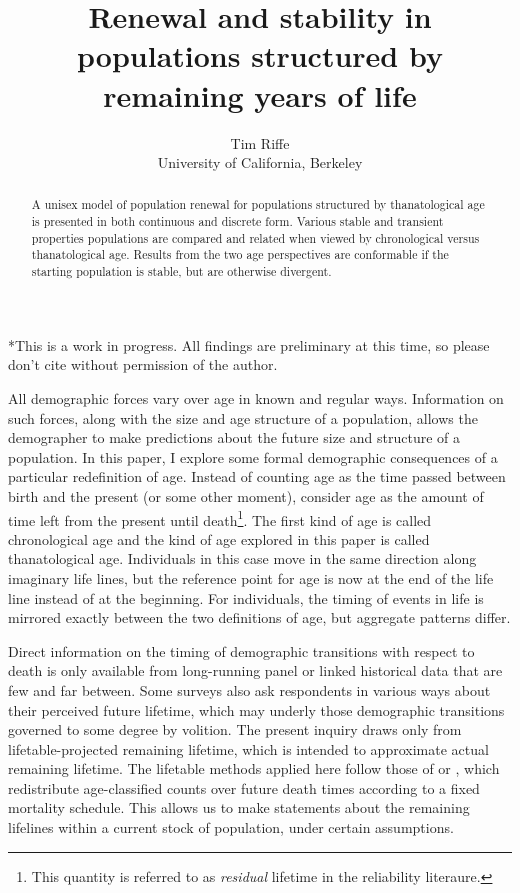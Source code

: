\documentclass{article}
\begin{document}
\title{Renewal and stability in populations structured by remaining
years of life}
\author{Tim Riffe \\ University of California, Berkeley}
\maketitle

\begin{abstract}
A unisex model of population renewal for populations structured by
thanatological age is presented in both continuous and discrete form. Various
stable and transient properties populations are compared and related when viewed
by chronological versus thanatological age. Results from the two age perspectives are conformable if the starting
population is stable, but are otherwise divergent.
\end{abstract}

*This is a work in progress. All findings are preliminary at this time, so
please don't cite without permission of the author.
\vspace{2em}

\onehalfspacing
All demographic forces vary over age in known and regular ways. Information on
such forces, along with the size and age structure of a population, allows the
demographer to make predictions about the future size and structure of a population. In this
paper, I explore some formal demographic consequences of a particular
redefinition of age. Instead of counting age as the time passed between birth and the present (or
some other moment), consider age as the amount of time left from the present
until death\footnote{This quantity is referred to as \textit{residual} lifetime
in the reliability literaure.}. The first kind of age is called
chronological age and the kind of age explored in this paper is
called thanatological age. Individuals in this case move in the same direction
along imaginary life lines, but the reference point for age is now at the end of the life line instead of at the beginning. For individuals, the timing of events in life is mirrored exactly between the two definitions of age,
but aggregate patterns differ.

Direct information on the timing of demographic transitions with respect to
death is only available from long-running panel or linked historical data that are few and far between. Some surveys also ask respondents in various ways about
their perceived future lifetime, which may underly those
demographic transitions governed to some degree by volition. The present inquiry
draws only from lifetable-projected remaining lifetime, which
is intended to approximate actual remaining lifetime.
The lifetable methods applied here follow those of \citet{brouard1986structure}
or \citet{miller2001increasing}, which redistribute age-classified counts over
future death times according to a fixed mortality schedule. This allows us to make statements about the remaining lifelines within a current stock of population, under certain assumptions.
\end{document}
